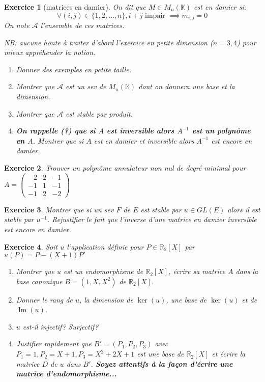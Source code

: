 \documentclass[12pt,a4paper]{article}
\newcommand{\R}{\mathbb{R}}
\newcommand{\K}{\mathbb{K} }
\DeclareMathOperator{\Ima }{Im}
\theoremstyle{break}
\theoremstyle{break}
\newtheorem{Exo}{Exercice}
\begin{document}
\begin{Exo}[matrices en damier]
	On dit que $M\in M_n(\K)$ est en damier si:
	$$\forall (i,j)\in \{1,2,...,n\},i+j\text{ impair }\implies m_{i,j}=0$$
	On note $\mathcal{A}$ l'ensemble de ces matrices.
	
	\vspace*{2mm}
	NB: aucune honte à traiter d'abord l'exercice en petite dimension ($n=3,4$) pour mieux appréhender la notion.
	\begin{enumerate}
		\item Donner des exemples en petite taille.
		\item
		Montrer que $\mathcal{A}$ est un sev de $M_n(\K)$ dont on donnera une base et la dimension.
		\item Montrer que $\mathcal{A}$ est stable par produit.
		\item  \textbf{On rappelle (?) que si $A$ est inversible alors $A^{-1}$ est un polynôme en $A$}. Montrer que si $A$ est en damier et inversible alors $A^{-1}$ est encore en damier.
	\end{enumerate}
\end{Exo}

\begin{Exo}
	Trouver un polynôme annulateur non nul de degré minimal pour $A=\begin{pmatrix}
	-2 & 2 & -1 \\
	-1 & 1 & -1 \\
	-1 & 2 & -2
	\end{pmatrix}$
\end{Exo}

\begin{Exo}
	Montrer que si un sev $F$ de $E$ est stable par $u\in GL(E)$ alors il est stable par $u^{-1}$. Rejustifier le fait que l'inverse d'une matrice en damier inversible est encore en damier.
\end{Exo}






\begin{Exo}
	Soit $u$ l'application définie pour $P\in \R_2[X]$ par $u(P)=P-(X+1)P'$
\begin{enumerate}

	\item
	Montrer que $u$ est un endomorphisme de $\R_2[X]$, écrire sa matrice $A$ dans la base canonique $B=(1,X,X^2)$ de $\R_2[X]$.
	\item
	Donner le rang de $u$, la dimension de $\ker(u)$, une base de $\ker(u)$ et de $\Ima(u)$.
	\item $u$ est-il injectif? Surjectif?
	\item
	Justifier rapidement que $B'=(P_{1},P_{2},P_{3})$ avec $P_{1}=1,P_{2}=X+1,P_{3}=X^2+2X+1$ est une base de $\R_2[X]$ et écrire la matrice $D$ de $u$ dans $B'$.  \textbf{Soyez attentifs à la fa\c con d'écrire une matrice d'endomorphisme...}%
\end{enumerate}
\end{Exo}
\end{document}
